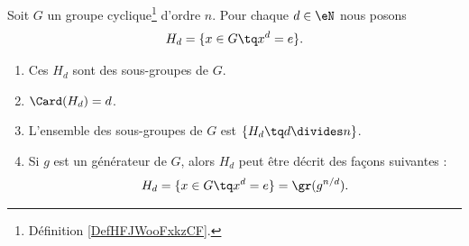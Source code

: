 \begin{theorem}     \label{THOooRGSTooIWyhqt}
	Soit \( G\) un groupe cyclique\footnote{Définition \ref{DefHFJWooFxkzCF}.} d'ordre \( n\). Pour chaque \( d\in \eN\) nous posons
	\begin{equation}
		H_d=\{ x\in G\tq x^d=e \}.
	\end{equation}
	\begin{enumerate}
		\item
		      Ces \( H_d\) sont des sous-groupes de \( G\).
		\item
		      \( \Card(H_d)=d\).
		\item       \label{ITEMooMJCXooCIWSmK}
		      L'ensemble des sous-groupes de \( G\) est \( \{ H_d\tq d\divides n \}\).
		\item     \label{ITEMooIEGUooPQWEep}
		      Si \( g\) est un générateur de \( G\), alors \( H_d\) peut être décrit des façons suivantes :
		      \begin{equation}
			      H_d=\{ x\in G\tq x^d=e \}=\gr(g^{n/d}).
		      \end{equation}
	\end{enumerate}
\end{theorem}

